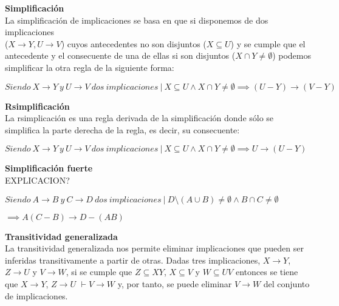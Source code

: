 
\bigskip
\textbf{Simplificaci\'on}\\
La simplificaci\'on de implicaciones se basa en que si disponemos de dos implicaciones \\ (\(X \to Y , U \to V\)) cuyos antecedentes no son disjuntos (\(X \subseteq U\)) y se cumple que el antecedente y el consecuente de una de ellas si son disjuntos (\(X \cap Y \neq \emptyset\)) podemos simplificar la otra regla de la siguiente forma:

\begin{center}
    \(Siendo \ X \to Y \ y \ U\to V \ dos \ implicaciones \ | \ X \subseteq U \wedge X \cap Y \neq \emptyset \implies (U - Y) \to (V - Y)\)
\end{center}


\bigskip
\textbf{Rsimplificaci\'on}\\
La rsimplicaci\'on es una regla derivada de la simplificaci\'on donde s\'olo se simplifica la parte derecha de la regla, es decir, su consecuente:

\begin{center}
    \(Siendo \ X \to Y \ y \ U\to V \ dos \ implicaciones \ | \ X \subseteq U \wedge X \cap Y \neq \emptyset \implies U \to (U - Y)\)
\end{center}


\bigskip

% 
\textbf{Simplificaci\'on fuerte}\\

EXPLICACION?

\begin{center}
    \(Siendo \ A \to B \ y \ C\to D \ dos \ implicaciones \ | \ D \setminus (A \cup B) \neq \emptyset \wedge B \cap C \neq \emptyset\)
\end{center}

\begin{center}
    \(\implies A(C-B) \to D - (AB)\)
\end{center}


\bigskip

\textbf{Transitividad generalizada}\\

La transitividad generalizada nos permite eliminar implicaciones que pueden ser inferidas transitivamente a partir de otras. Dadas tres implicaciones, \(X \to Y\), \(Z \to U\) y \(V \to W\), si se cumple que \(Z \subseteq XY \), \( X \subseteq V \) y \( W \subseteq UV \) entonces se tiene que  \(X \to Y\), \(Z \to U\) \( \vdash V \to W\) y, por tanto, se puede eliminar \(V \to W\) del conjunto de implicaciones.\\


\newpage
